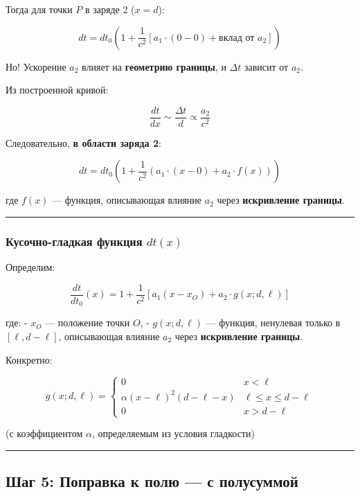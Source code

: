 \documentclass[11pt]{article}
\begin{document}
Тогда для точки \(P\) в заряде 2 (\(x = d\)):

\[
dt = dt_0 \left( 1 + \frac{1}{c^2} \left[ a_1 \cdot (0 - 0) + \text{вклад от } a_2 \right] \right)
\]

Но! Ускорение \(a_2\) влияет на \textbf{геометрию границы}, и
\(\Delta t\) зависит от \(a_2\).

Из построенной кривой:

\[
\frac{dt}{dx} \sim \frac{\Delta t}{d} \propto \frac{a_2}{c^2}
\]

 Следовательно, \textbf{в области заряда 2}:

\[
dt = dt_0 \left( 1 + \frac{1}{c^2} \left( a_1 \cdot (x - 0) + a_2 \cdot f(x) \right) \right)
\]

где \(f(x)\) --- функция, описывающая влияние \(a_2\) через
\textbf{искривление границы}.

\begin{center}\rule{0.5\linewidth}{\linethickness}\end{center}

\subsubsection{\texorpdfstring{Кусочно-гладкая функция
\(dt(x)\)}{ Кусочно-гладкая функция dt(x)}}

Определим:

\[
\boxed{
\frac{dt}{dt_0}(x) = 1 + \frac{1}{c^2} \left[ a_1 (x - x_O) + a_2 \cdot g(x; d, \ell) \right]
}
\]

где: - \(x_O\) --- положение точки \(O\), - \(g(x; d, \ell)\) ---
функция, ненулевая только в \([\ell, d - \ell]\), описывающая влияние
\(a_2\) через \textbf{искривление границы}.

Конкретно:

\[
g(x; d, \ell) =
\begin{cases}
0 & x < \ell \\
\alpha (x - \ell)^2 (d - \ell - x) & \ell \le x \le d - \ell \\
0 & x > d - \ell
\end{cases}
\]

(с коэффициентом \(\alpha\), определяемым из условия гладкости)

\begin{center}\rule{0.5\linewidth}{\linethickness}\end{center}

\subsection{ Шаг 5: Поправка к полю --- с полусуммой}
\end{document}
